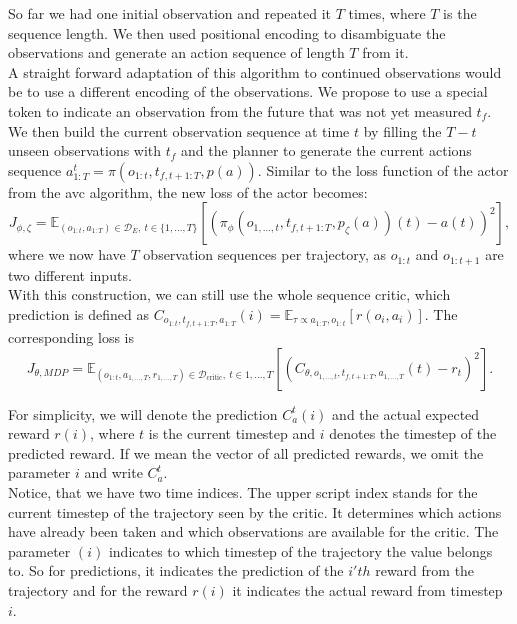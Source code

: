 So far we had one initial observation and repeated it $T$ times, where $T$ is the sequence length. We then used positional encoding to disambiguate the observations and generate an action sequence of 
length $T$ from it.\\ 

A straight forward adaptation of this algorithm to continued observations would be to use a different encoding of the observations. We propose to use a special token to indicate an 
observation from the future that was not yet measured $t_f$. We then build the current observation sequence at time $t$ by filling the $T - t$ unseen observations with $t_f$ and 
the planner to 
generate the current actions sequence $a^t_{1:T} = \pi(o_{1:t}, t_{f, t+1:T}, p(a))$. Similar to the loss function of the actor from the \ac{avc} algorithm, the new loss of the actor becomes: 
\begin{equation}
    \label{dense_actor_objective}
    J_{\phi, \zeta} = \mathbb{E}_{(o_{1:t}, a_{1:T}) \in \mathcal{D}_E,\ t \in \{1, ..., T\}}\left[\left( \pi_{\phi}(o_{1, ..., t}, t_{f, t+1:T}, p_{\zeta}(a))(t) - a(t)\right)^2\right],
\end{equation}
where we now have $T$ observation sequences per trajectory, as $o_{1:t}$ and $o_{1:t+1}$ are two different inputs.\\
With this construction, we can still use the whole sequence critic, 
which prediction is defined as $C_{o_{1:t}, t_{f, t+1:T}, a_{1:T}}(i) = \mathbb{E}_{\tau \propto a_{1:T}, o_{1:t}}\left[r(o_i, a_i)\right]$. The corresponding loss is
\begin{equation}
    \label{eq:dense_critic_loss}
    J_{\theta, MDP} = \mathbb{E}_{(o_{1:t}, a_{1,...,T}, r_{1,...,T}) \in \mathcal{D}_{\text{critic}},\ t \in {1, ..., T}}\left[(C_{\theta, o_{1, ..., t}, t_{f, t+1:T},  a_{1,...,T}}(t) - r_t)^2\right].
\end{equation}

For simplicity, we will denote the prediction 
$C_a^t(i)$ and the actual expected reward $r(i)$, where $t$ is the current timestep and $i$ denotes the timestep of the predicted reward. If we mean the vector of all predicted rewards, we omit the 
parameter $i$ and write $C_a^t$.\\ 

Notice, that we have two time indices. The upper script index stands for the current timestep of the trajectory seen by the critic. 
It determines which actions have already been taken and 
which observations are available for the critic. The parameter $(i)$ indicates to which timestep of the trajectory the value belongs to. So for predictions, it indicates the prediction of the $i'th$ 
reward from the trajectory and for the reward $r(i)$ it indicates the actual reward from timestep $i$.\\ 


